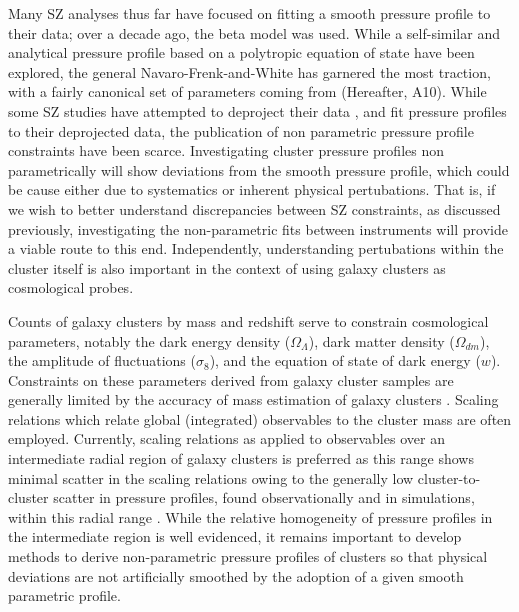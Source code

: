 \documentclass[twocolumn,traditabstract]{aa}
\begin{document}
Many SZ analyses thus far have focused on fitting a smooth pressure profile to their data; over a decade ago, the beta model
\citep{cavaliere1978} was used. While a self-similar \citep{mroczkowski2009} and analytical pressure profile based on a
polytropic equation of state \citep{bulbul2010} have been explored, the general Navaro-Frenk-and-White
\citep[gNFW][]{nagai2007} has garnered the most traction, with a fairly canonical set of parameters coming from
\citet{arnaud2010} (Hereafter, A10). While some SZ studies have attempted to deproject their data \citep[e.g.][]{sayers2013},
and fit pressure profiles to their deprojected data, the publication of non parametric pressure profile constraints have
been scarce. Investigating cluster pressure profiles non parametrically will show deviations from the smooth pressure profile,
which could be cause either due to systematics or inherent physical pertubations. That is, if we wish to better understand
discrepancies between SZ constraints, as discussed previously, investigating the non-parametric fits between instruments will
provide a viable route to this end. Independently, understanding pertubations within the cluster itself is also important in
the context of using galaxy clusters as cosmological probes.

Counts of galaxy clusters by mass and redshift serve to constrain cosmological parameters, notably the dark energy density
($\Omega_{\Lambda}$), dark matter density ($\Omega_{dm}$), the amplitude of fluctuations ($\sigma_8$),
and the equation of state of dark energy ($w$). Constraints on these
parameters derived from galaxy cluster samples are generally limited by the accuracy of mass estimation of 
galaxy clusters \citep[e.g.][]{hasselfield2013, reichardt2013}. Scaling relations which relate global (integrated) observables
to the cluster mass are often employed. Currently, scaling relations as applied to observables over an intermediate radial
region of galaxy clusters is preferred as this range shows minimal scatter in the scaling relations \citep[e.g.][]{kravtsov2012}
owing to the generally low cluster-to-cluster scatter in pressure profiles, found observationally and in simulations,
within this radial range \citep[e.g.][]{borgani2004,nagai2007,arnaud2010,bonamente2012,planck2013a,sayers2013}.
While the relative homogeneity of pressure profiles in the intermediate region is well evidenced, it remains important to
develop methods to derive non-parametric pressure profiles of clusters so that physical deviations are not artificially
smoothed by the adoption of a given smooth parametric profile. 
\end{document}

